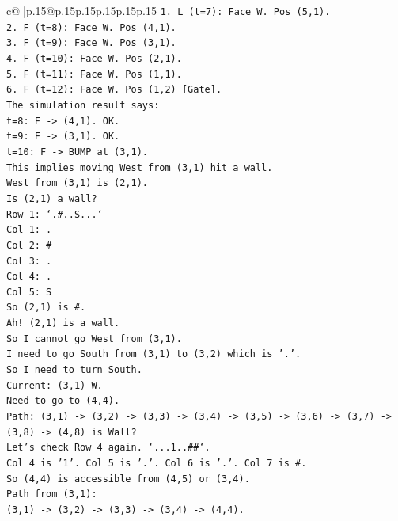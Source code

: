 \documentclass{article}
\begin{document}
{\begin{supertabular}{c@{$\;$}|p{.15\linewidth}@{}p{.15\linewidth}p{.15\linewidth}p{.15\linewidth}p{.15\linewidth}p{.15\linewidth}}
{{{\texttt{1. L (t=7): Face W. Pos (5,1).} \\
\texttt{2. F (t=8): Face W. Pos (4,1).} \\
\texttt{3. F (t=9): Face W. Pos (3,1).} \\
\texttt{4. F (t=10): Face W. Pos (2,1).} \\
\texttt{5. F (t=11): Face W. Pos (1,1).} \\
\texttt{6. F (t=12): Face W. Pos (1,2) {[}Gate{]}.} \\
\texttt{The simulation result says:} \\
\texttt{t=8: F {-}> (4,1). OK.} \\
\texttt{t=9: F {-}> (3,1). OK.} \\
\texttt{t=10: F {-}> BUMP at (3,1).} \\
\texttt{This implies moving West from (3,1) hit a wall.} \\
\texttt{West from (3,1) is (2,1).} \\
\texttt{Is (2,1) a wall?} \\
\texttt{Row 1: `.\#..S...`} \\
\texttt{Col 1: .} \\
\texttt{Col 2: \#} \\
\texttt{Col 3: .} \\
\texttt{Col 4: .} \\
\texttt{Col 5: S} \\
\texttt{So (2,1) is \#.} \\
\texttt{Ah! (2,1) is a wall.} \\
\texttt{So I cannot go West from (3,1).} \\
\texttt{I need to go South from (3,1) to (3,2) which is '.'.} \\
\texttt{So I need to turn South.} \\
\texttt{Current: (3,1) W.} \\
\texttt{Need to go to (4,4).} \\
\texttt{Path: (3,1) {-}> (3,2) {-}> (3,3) {-}> (3,4) {-}> (3,5) {-}> (3,6) {-}> (3,7) {-}> (3,8) {-}> (4,8) is Wall?} \\
\texttt{Let's check Row 4 again. `...1..\#\#`.} \\
\texttt{Col 4 is '1'. Col 5 is '.'. Col 6 is '.'. Col 7 is \#.} \\
\texttt{So (4,4) is accessible from (4,5) or (3,4).} \\
\texttt{Path from (3,1):} \\
\texttt{(3,1) {-}> (3,2) {-}> (3,3) {-}> (3,4) {-}> (4,4).} \\
}}}
\end{supertabular}}
\end{document}
